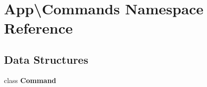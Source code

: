 \section{App\textbackslash{}Commands Namespace Reference}
\label{namespace_app_1_1_commands}
\subsection*{Data Structures}
\begin{DoxyCompactItemize}
\item 
class {\bf Command}
\end{DoxyCompactItemize}
